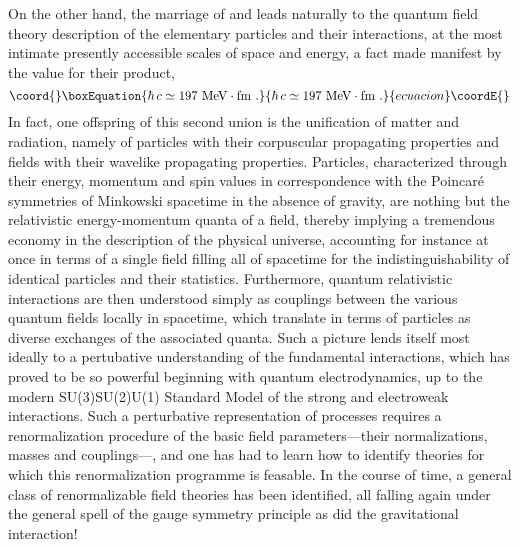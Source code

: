 \documentclass[a4paper,11pt]{article}
\begin{document}
On the other hand, the marriage of \coordHE{} and \myHighlight{$\hbar$}\coordHE{} leads naturally to 
the quantum field theory description of the elementary particles and
their interactions, at the most intimate presently accessible scales of 
space and energy, a fact made manifest by the value for their product,
\begin{equation}\coord{}\boxEquation{
\hbar\,c\simeq 197\ {\rm MeV}\cdot{\rm fm}\ .
}{
\hbar\,c\simeq 197\ {\rm MeV}\cdot{\rm fm}\ .
}{ecuacion}\coordE{}\end{equation}
In fact, one offspring of this second union is the unification of
matter and radiation, namely of particles with their corpuscular propagating
properties and fields with their wavelike propagating properties. Particles,
cha\-rac\-te\-ri\-zed through their energy, momentum and spin values 
in correspondence
with the Poincar\'e symmetries of Minkowski spacetime in the absence of 
gravity, are nothing but the relativistic energy-momentum quanta of a field,
thereby implying a tremendous economy in the description of the
physical universe, accounting for instance at once in terms of a single
field filling all of spacetime for the indistinguishability of identical 
particles and their statistics. Furthermore, quantum relativistic 
interactions are then understood simply as couplings between the various 
quantum fields locally in spacetime, which translate
in terms of particles as diverse exchanges of the associated quanta.
Such a picture lends itself most ideally to a pertubative understanding
of the fundamental interactions, which has proved to be so powerful
beginning with quantum elec\-tro\-dy\-na\-mics, up to the modern
SU(3)\coordHE{}SU(2)\coordHE{}U(1)\coordHE{} Standard Model of the
strong and electroweak interactions. Such a perturbative representation
of processes requires a renormalization procedure of the basic field
parameters---their normalizations, masses and couplings---,
and one has had to learn how to identify theories for which this
renormalization programme is feasable. In the course of time, a general
class of renormalizable field theories has been identified, all falling
again under the general spell of the gauge symmetry principle as did the
gravitational interaction! 
\end{document}
